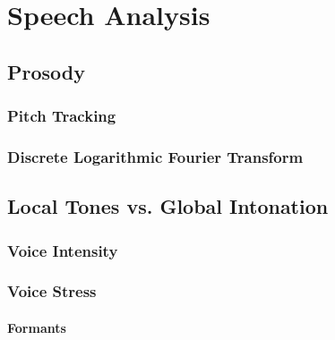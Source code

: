 \chapter{Speech Analysis}
\label{ch:speech analysis}


\section{Prosody}
\label{sec:Prosody}


\subsection{Pitch Tracking}
\label{sub:Pitch Tracking}


\subsection{Discrete Logarithmic Fourier Transform}
\label{sub:Discrete Logarithmic Fourier Transform}


\section{Local Tones vs. Global Intonation}
\label{sec:Local Tones vs. Global Intonation}


\subsection{Voice Intensity}
\label{sub:Voice Intensity}


\subsection{Voice Stress}
\label{sub:Voice Stress}

\subsubsection{Formants}
\label{subs:Formants}
